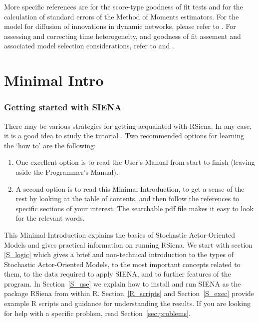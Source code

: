 \documentclass[a4paper,fleqn,11pt]{article}
\newcommand{\+}{\, + \,}
\newcommand{\R}{{\sf R }}
\newcommand{\Rn}{{\sf R}}
\newcommand{\rs}{{\sf RSiena}}
\newcommand{\RS}{{\sf RSiena }}
\newcommand{\SI}{{\sf SIENA }}
\newcommand{\si}{{\sf SIENA}}
\newcommand{\saom}{{Stochastic Actor-Oriented Model}}
\begin{document}
More specific references are \citet{Schweinberger12} for the score-type goodness
of fit tests and \citet{SchweinbergerSnijders07a} for the calculation of
standard errors of the Method of Moments estimators.
For the model for diffusion of innovations in dynamic networks,
please refer to \citet{Greenan14}.
For assessing and
correcting time heterogeneity, and goodness of fit assement and associated model
selection considerations, refer to \citet*{Lospinoso2011} and \citet{Lospinoso2012}.

\newpage
\part{Minimal Intro}



\section{Getting started with \SI}
\label{S_minsi1}

There may be various strategies for getting acquainted with \rs.
In any case, it is a good idea to study the tutorial  \citet{SnijdersEA10b}.
Two recommended options for learning the `how to' are the following:
\begin{enumerate}
\item One excellent option is to read the User's Manual
from start to finish (leaving aside the Programmer's Manual).
\item A second option is to read this Minimal Introduction, to get a sense
 of the rest by looking at the table of contents, and then follow
			the references to specific sections of your interest.
  The searchable pdf file makes it easy to look for the relevant words.
\end{enumerate}

\noindent
This Minimal Introduction explains the basics of {\saom}s
and gives practical information on running \rs.
We start with section \ref{S_logic} which gives a brief and non-technical
introduction to the types of {\saom}s, to the most important concepts related
to them, to the data required to apply \si, and to further features of the program.
In Section~\ref{S_use} we explain how to install and run \SI
as the package \RS from within \Rn. Section~\ref{R_scripts} and
Section~\ref{S_exec} provide example \R scripts and guidance for
understanding the results.
If you are looking for help with a specific problem, read
Section~\ref{sec:problems}.
\end{document}

